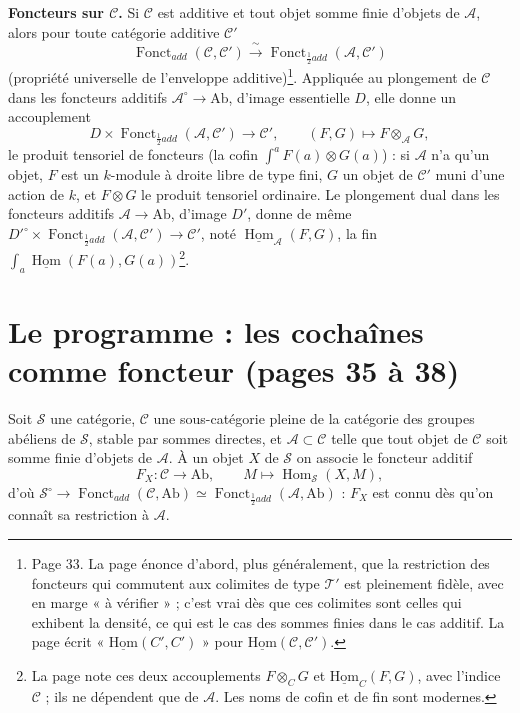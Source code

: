 \documentclass[11pt,a4paper]{article}
\begin{document}
\textbf{Foncteurs sur $\mathcal{C}$.} Si $\mathcal{C}$ est additive et tout
objet somme finie d'objets de $\mathcal{A}$, alors pour toute catégorie
additive $\mathcal{C}'$
\[
  \operatorname{Fonct}_{add}(\mathcal{C}, \mathcal{C}') \xrightarrow{\ \sim\ }
  \operatorname{Fonct}_{\frac{1}{2}add}(\mathcal{A}, \mathcal{C}')
\]
(propriété universelle de l'enveloppe additive)\footnote{Page 33. La page
énonce d'abord, plus généralement, que la restriction des foncteurs qui
commutent aux colimites de type $\mathcal{T}'$ est pleinement fidèle, avec
en marge « à vérifier » ; c'est vrai dès que ces colimites sont celles qui
exhibent la densité, ce qui est le cas des sommes finies dans le cas
additif. La page écrit « $\underline{\mathrm{Hom}}(C', C')$ » pour
$\underline{\mathrm{Hom}}(\mathcal{C}, \mathcal{C}')$.}. Appliquée au
plongement de $\mathcal{C}$ dans les foncteurs additifs
$\mathcal{A}^{\circ} \to \mathrm{Ab}$, d'image essentielle $D$, elle donne un
accouplement
\[
  D \times \operatorname{Fonct}_{\frac{1}{2}add}(\mathcal{A}, \mathcal{C}')
  \to \mathcal{C}', \qquad (F, G) \mapsto F \otimes_{\mathcal{A}} G ,
\]
le produit tensoriel de foncteurs (la cofin $\int^{a} F(a) \otimes G(a)$) :
si $\mathcal{A}$ n'a qu'un objet, $F$ est un $k$-module à droite libre de
type fini, $G$ un objet de $\mathcal{C}'$ muni d'une action de $k$, et
$F \otimes G$ le produit tensoriel ordinaire. Le plongement dual dans les
foncteurs additifs $\mathcal{A} \to \mathrm{Ab}$, d'image $D'$, donne de même
$D'^{\circ} \times \operatorname{Fonct}_{\frac{1}{2}add}(\mathcal{A},
\mathcal{C}') \to \mathcal{C}'$, noté $\underline{\operatorname{Hom}}_{\mathcal{A}}(F,
G)$, la fin $\int_{a} \underline{\operatorname{Hom}}(F(a), G(a))$\footnote{La
page note ces deux accouplements $F \otimes_{C} G$ et
$\underline{\mathrm{Hom}}_{C}(F, G)$, avec l'indice $\mathcal{C}$ ; ils ne
dépendent que de $\mathcal{A}$. Les noms de cofin et de fin sont modernes.}.

\section*{Le programme : les cochaînes comme foncteur (pages 35 à 38)}

Soit $\mathcal{S}$ une catégorie, $\mathcal{C}$ une sous-catégorie pleine de
la catégorie des groupes abéliens de $\mathcal{S}$, stable par sommes
directes, et $\mathcal{A} \subset \mathcal{C}$ telle que tout objet de
$\mathcal{C}$ soit somme finie d'objets de $\mathcal{A}$. À un objet $X$ de
$\mathcal{S}$ on associe le foncteur additif
\[
  F_{X} : \mathcal{C} \to \mathrm{Ab}, \qquad M \mapsto
  \operatorname{Hom}_{\mathcal{S}}(X, M),
\]
d'où $\mathcal{S}^{\circ} \to \operatorname{Fonct}_{add}(\mathcal{C},
\mathrm{Ab}) \simeq \operatorname{Fonct}_{\frac{1}{2}add}(\mathcal{A},
\mathrm{Ab})$ : $F_{X}$ est connu dès qu'on connaît sa restriction à
$\mathcal{A}$.
\end{document}
